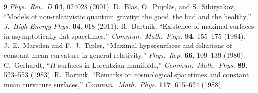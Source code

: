 \documentclass[11pt]{article}
\begin{document}
\begin{thebibliography}{9}
  \emph{Phys.\ Rev.\ D} \textbf{64}, 024028 (2001).
 D.~Blas, O.~Pujol\`as, and S.~Sibiryakov, ``Models of non-relativistic
  quantum gravity: the good, the bad and the healthy,'' \emph{J.\ High Energy Phys.} \textbf{04}, 018 (2011).
 R.~Bartnik, ``Existence of maximal surfaces in asymptotically flat spacetimes,''
  \emph{Commun.\ Math.\ Phys.} \textbf{94}, 155--175 (1984).
 J.~E.~Marsden and F.~J.~Tipler, ``Maximal hypersurfaces and foliations of
  constant mean curvature in general relativity,'' \emph{Phys.\ Rep.} \textbf{66}, 109--139 (1980).
 C.~Gerhardt, ``$H$-surfaces in Lorentzian manifolds,''
  \emph{Commun.\ Math.\ Phys.} \textbf{89}, 523--553 (1983).
 R.~Bartnik, ``Remarks on cosmological spacetimes and constant mean curvature
  surfaces,'' \emph{Commun.\ Math.\ Phys.} \textbf{117}, 615--624 (1988).
\end{thebibliography}
\endgroup
\end{document}
